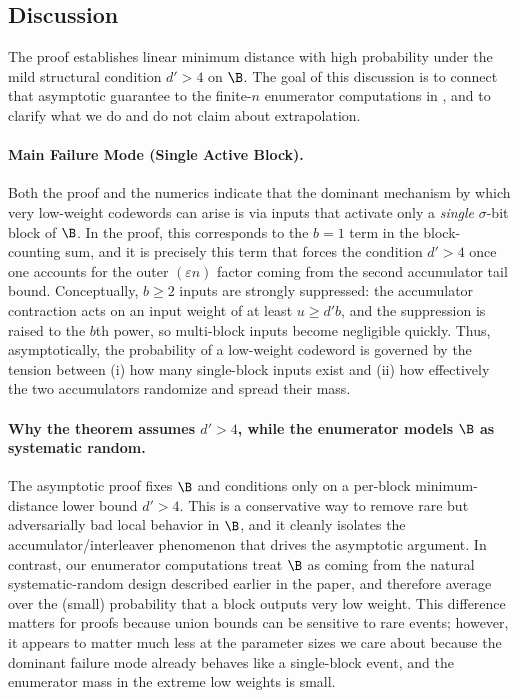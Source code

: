 \subsection{Discussion}
The  proof establishes linear minimum distance with high probability under the
mild structural condition $d'>4$ on $\B$. The goal of this discussion is to connect that
asymptotic guarantee to the finite-$n$ enumerator computations in ,
and to clarify what we do and do not claim about extrapolation.

\paragraph{Main Failure Mode (Single Active Block).}
Both the proof and the numerics indicate that the dominant mechanism by which very low-weight
codewords can arise is via inputs that activate only a \emph{single} $\sigma$-bit block of $\B$.
In the proof, this corresponds to the $b=1$ term in the block-counting sum, and it is precisely
this term that forces the condition $d'>4$ once one accounts for the outer $(\varepsilon n)$ factor
coming from the second accumulator tail bound. Conceptually, $b\ge 2$ inputs are strongly suppressed:
the accumulator contraction acts on an input weight of at least $u\ge d'b$, and the suppression is
raised to the $b$th power, so multi-block inputs become negligible quickly. Thus, asymptotically,
the probability of a low-weight codeword is governed by the tension between (i) how many single-block
inputs exist and (ii) how effectively the two accumulators randomize and spread their mass.

\paragraph{Why the theorem assumes $d'>4$, while the enumerator models $\B$ as systematic random.}
The asymptotic proof fixes $\B$ and conditions only on a per-block minimum-distance lower bound $d'>4$.
This is a conservative way to remove rare but adversarially bad local behavior in $\B$, and it cleanly
isolates the accumulator/interleaver phenomenon that drives the asymptotic argument.
In contrast, our enumerator computations treat $\B$ as coming from the natural systematic-random design
described earlier in the paper, and therefore average over the (small) probability that a block outputs
very low weight. This difference matters for proofs because union bounds can be sensitive to rare events;
however, it appears to matter much less at the parameter sizes we care about because the dominant failure
mode already behaves like a single-block event, and the enumerator mass in the extreme low weights is small.

